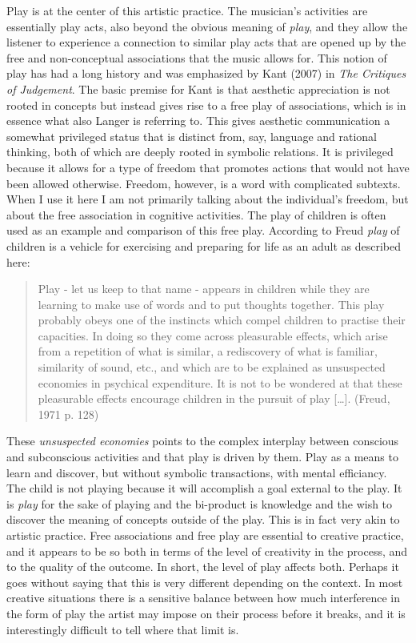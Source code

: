 \documentclass[11pt]{article}
\makeatletter
\newcommand{\citeprocitem}[2]{\hyper@linkstart{cite}{citeproc_bib_item_#1}#2\hyper@linkend}
\makeatother
\begin{document}
Play is at the center of this artistic practice. The musician's activities are essentially play acts, also beyond the obvious meaning of \emph{play}, and they allow the listener to experience a connection to similar play acts that are opened up by the free and non-conceptual associations that the music allows for. This notion of play has had a long history and was emphasized by Kant (\citeprocitem{11}{2007}) in \emph{The Critiques of Judgement}. The basic premise for Kant is that aesthetic appreciation is not rooted in concepts but instead gives rise to a free play of associations, which is in essence what also Langer is referring to. This gives aesthetic communication a somewhat privileged status that is distinct from, say, language and rational thinking, both of which are deeply rooted in symbolic relations. It is privileged because it allows for a type of freedom that promotes actions that would not have been allowed otherwise. Freedom, however, is a word with complicated subtexts. When I use it here I am not primarily talking about the individual's freedom, but about the free association in cognitive activities. The play of children is often used as an example and comparison of this free play. According to Freud \emph{play} of children is a vehicle for exercising and preparing for life as an adult as described here:
\begin{quote}
Play - let us keep to that name - appears in children while they are learning to make use of words and to put thoughts together. This play probably obeys one of the instincts which compel children to practise their capacities. In doing so they come across pleasurable effects, which arise from a repetition of what is similar, a rediscovery of what is familiar, similarity of sound, etc., and which are to be explained as unsuspected economies in psychical expenditure. It is not to be wondered at that these pleasurable effects encourage children in the pursuit of play [\ldots{}]. (\citeprocitem{7}{Freud, 1971} p. 128)
\end{quote}

These \emph{unsuspected economies} points to the complex interplay between conscious and subconscious activities and that play is driven by them. Play as a means to learn and discover, but without symbolic transactions, with mental efficiancy. The child is not playing because it will accomplish a goal external to the play. It is \emph{play} for the sake of playing and the bi-product is knowledge and the wish to discover the meaning of concepts outside of the play. This is in fact very akin to artistic practice. Free associations and free play are essential to creative practice, and it appears to be so both in terms of the level of creativity in the process, and to the quality of the outcome. In short, the level of play affects both. Perhaps it goes without saying that this is very different depending on the context. In most creative situations there is a sensitive balance between how much interference in the form of play the artist may impose on their process before it breaks, and it is interestingly difficult to tell where that limit is.
\end{document}
